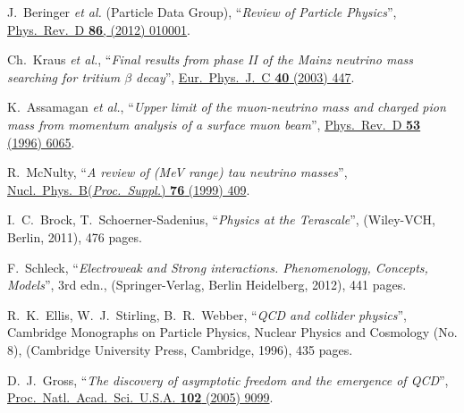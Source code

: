 \begin{thebibliography}{00}
J.~Beringer {\it et al.} (Particle Data Group),
``\textit{Review of Particle Physics}'',\\
\href{http://dx.doi.org/10.1103/PhysRevD.86.010001}{Phys.\ Rev.\ D {\bf 86}, (2012) 010001}.



Ch.~Kraus {\it et al.},
``\textit{Final results from phase II of the Mainz neutrino mass searching for tritium $\beta$ decay}'',
\href{http://dx.doi.org/10.1140/epjc/s2005-02139-7}{Eur.\ Phys.\ J.\ C {\bf 40} (2003) 447}.


K.~Assamagan {\it et al.},
``\textit{Upper limit of the muon-neutrino mass and charged pion mass from momentum analysis of a surface muon beam}'',
\href{http://dx.doi.org/10.1103/PhysRevD.53.6065}{Phys.\ Rev.\ D {\bf 53} (1996) 6065}.



R.~McNulty,
``\textit{A review of (MeV range) tau neutrino masses}'',\\
\href{http://dx.doi.org/10.1016/S0920-5632(99)00502-2}{Nucl.\ Phys.\ B({\it Proc.\ Suppl.}) {\bf 76} (1999) 409}.



I.~C.~Brock, T.~Schoerner-Sadenius,
``\textit{Physics at the Terascale}'',
(Wiley-VCH, Berlin, 2011), 476 pages.


F.~Schleck,
``\textit{Electroweak and Strong interactions. Phenomenology, Concepts, Models}'',
3rd edn., (Springer-Verlag, Berlin Heidelberg, 2012), 441 pages.






R.~K.~Ellis, W.~J.~Stirling, B.~R.~Webber,
``\textit{QCD and collider physics}'',
Cambridge Monographs on Particle Physics, Nuclear Physics and Cosmology (No. 8),
(Cambridge University Press, Cambridge, 1996), 435 pages.



D.~J.~Gross,
``\textit{The discovery of asymptotic freedom and the emergence of QCD}'',\\
\href{http://dx.doi.org/10.1073/pnas.0503831102}{Proc.\ Natl.\ Acad.\ Sci.\ U.S.A. {\bf 102} (2005) 9099}.




\end{thebibliography}
